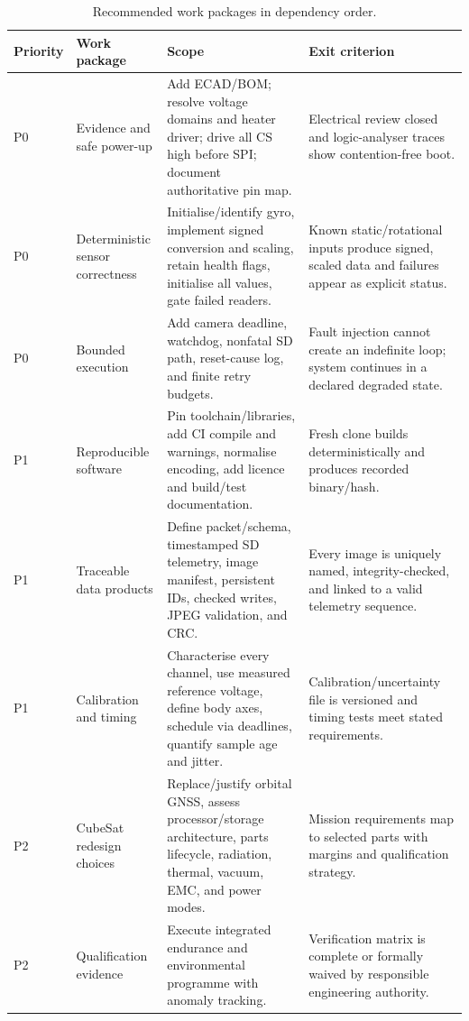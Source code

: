 \documentclass[11pt,a4paper]{article}
\begin{document}
\begin{table}[H]
\centering
\caption{Recommended work packages in dependency order.}
\label{tab:roadmap}
\small
\begin{tabularx}{\textwidth}{P{0.12\textwidth}P{0.20\textwidth}Y P{0.22\textwidth}}
\toprule
Priority & Work package & Scope & Exit criterion\\
\midrule
P0 & Evidence and safe power-up & Add ECAD/BOM; resolve voltage domains and heater driver; drive all CS high before SPI; document authoritative pin map. & Electrical review closed and logic-analyser traces show contention-free boot.\\
P0 & Deterministic sensor correctness & Initialise/identify gyro, implement signed conversion and scaling, retain health flags, initialise all values, gate failed readers. & Known static/rotational inputs produce signed, scaled data and failures appear as explicit status.\\
P0 & Bounded execution & Add camera deadline, watchdog, nonfatal SD path, reset-cause log, and finite retry budgets. & Fault injection cannot create an indefinite loop; system continues in a declared degraded state.\\
P1 & Reproducible software & Pin toolchain/libraries, add CI compile and warnings, normalise encoding, add licence and build/test documentation. & Fresh clone builds deterministically and produces recorded binary/hash.\\
P1 & Traceable data products & Define packet/schema, timestamped SD telemetry, image manifest, persistent IDs, checked writes, JPEG validation, and CRC. & Every image is uniquely named, integrity-checked, and linked to a valid telemetry sequence.\\
P1 & Calibration and timing & Characterise every channel, use measured reference voltage, define body axes, schedule via deadlines, quantify sample age and jitter. & Calibration/uncertainty file is versioned and timing tests meet stated requirements.\\
P2 & CubeSat redesign choices & Replace/justify orbital GNSS, assess processor/storage architecture, parts lifecycle, radiation, thermal, vacuum, EMC, and power modes. & Mission requirements map to selected parts with margins and qualification strategy.\\
P2 & Qualification evidence & Execute integrated endurance and environmental programme with anomaly tracking. & Verification matrix is complete or formally waived by responsible engineering authority.\\
\bottomrule
\end{tabularx}
\end{table}
\end{document}
